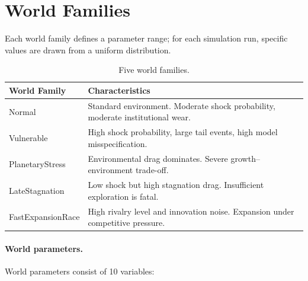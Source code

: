 \section{World Families}
\label{sec:vnext-world-families}

Each world family defines a parameter range; for each simulation run,
specific values are drawn from a uniform distribution.

\begin{table}[ht]
\centering
\small
\begin{tabularx}{\linewidth}{lX}
\toprule
\textbf{World Family} & \textbf{Characteristics} \\
\midrule
Normal
& Standard environment. Moderate shock probability, moderate
institutional wear. \\

Vulnerable
& High shock probability, large tail events, high model
misspecification. \\

PlanetaryStress
& Environmental drag dominates. Severe growth--environment
trade-off. \\

LateStagnation
& Low shock but high stagnation drag. Insufficient exploration is
fatal. \\

FastExpansionRace
& High rivalry level and innovation noise. Expansion under
competitive pressure. \\

\bottomrule
\end{tabularx}
\caption[Five world families]{Five world families.}
\label{tab:vnext-worlds}
\end{table}

\paragraph{World parameters.}
World parameters consist of 10 variables:

